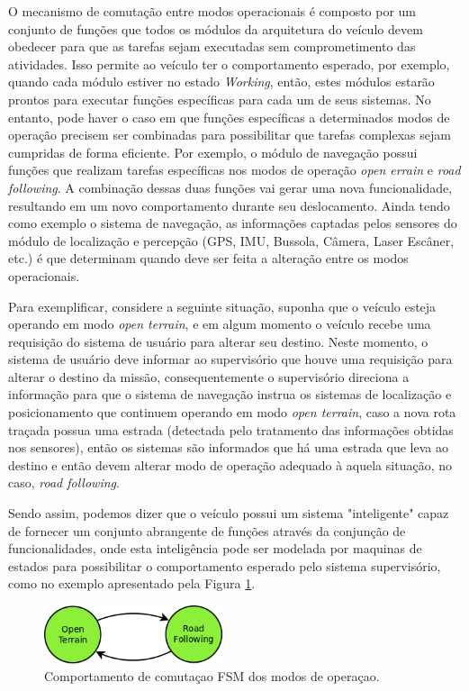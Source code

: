 \documentclass[conference]{IEEEtran}
\begin{document}
O mecanismo de comutação entre modos operacionais é composto por um conjunto de funções que todos os módulos da arquitetura do veículo devem obedecer para que as tarefas sejam executadas sem comprometimento das atividades. Isso permite ao veículo ter o comportamento esperado, por exemplo, quando cada módulo estiver no estado \textit{Working}, então, estes módulos estarão prontos para executar funções específicas para cada um de seus sistemas. No entanto, pode haver o caso em que funções específicas a determinados modos de operação precisem ser combinadas para possibilitar que tarefas complexas sejam cumpridas de forma eficiente. Por exemplo, o módulo de navegação possui funções que realizam tarefas específicas nos modos de operação \textit{open errain} e \textit{road following}. A combinação dessas duas funções vai gerar uma nova funcionalidade, resultando em um novo comportamento durante seu deslocamento. Ainda tendo como exemplo o sistema de navegação, as informações captadas pelos sensores do módulo de localização e percepção (GPS, IMU, Bussola, Câmera, Laser Escâner, etc.) é que determinam quando deve ser feita a alteração entre os modos operacionais. 

Para exemplificar, considere a seguinte situação, suponha que o veículo esteja operando em modo \textit{open terrain}, e em algum momento o veículo recebe uma requisição do sistema de usuário para alterar seu destino. Neste momento, o sistema de usuário deve informar ao supervisório que houve uma requisição para alterar o destino da missão, consequentemente o supervisório direciona a informação para que o sistema de navegação instrua os sistemas de localização e posicionamento que continuem operando em modo \textit{open terrain}, caso a nova rota traçada possua uma estrada (detectada pelo tratamento das informações obtidas nos sensores), então os sistemas são informados que há uma estrada que leva ao destino e então devem alterar modo de operação adequado à aquela situação, no caso, \textit{road following}.

Sendo assim, podemos dizer que o veículo possui um sistema "inteligente" capaz de fornecer um conjunto abrangente de funções através da conjunção de funcionalidades, onde esta inteligência pode ser modelada por maquinas de estados para possibilitar o comportamento esperado pelo sistema supervisório, como no exemplo apresentado pela Figura \ref{fig:VILMA_OPERATIONAL_MODE_BEHAVIOR}.

\begin{figure}[h]
	\centering
	\includegraphics[width=200px,keepaspectratio]{imagens/VILMA_OPERATIONAL_MODE_BEHAVIOR}
	\caption{Comportamento de comutaçao FSM dos modos de operaçao.}
	\label{fig:VILMA_OPERATIONAL_MODE_BEHAVIOR}
\end{figure}
\end{document}
